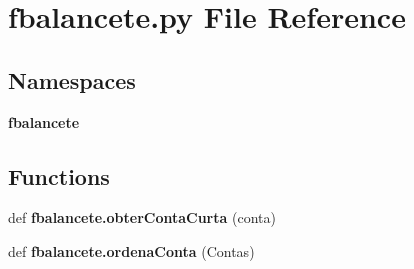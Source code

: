 \section{fbalancete.\+py File Reference}
\label{fbalancete_8py}
\subsection*{Namespaces}
\begin{DoxyCompactItemize}
\item 
 \textbf{ fbalancete}
\end{DoxyCompactItemize}
\subsection*{Functions}
\begin{DoxyCompactItemize}
\item 
def \textbf{ fbalancete.\+obter\+Conta\+Curta} (conta)
\item 
def \textbf{ fbalancete.\+ordena\+Conta} (Contas)
\end{DoxyCompactItemize}

